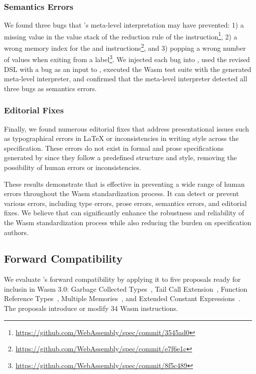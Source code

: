 \subsubsection*{Semantics Errors}
We found three bugs that \dslname's meta-level interpretation may have prevented:
1) a missing value in the value stack of the reduction rule of the 
instruction\footnote{\url{https://github.com/WebAssembly/spec/commit/3545ad0}},
2) a wrong memory index for the 
and 
instructions\footnote{\url{https://github.com/WebAssembly/spec/commit/e7f6e1c}}, and
3) popping a wrong number of values when exiting from
a label\footnote{\url{https://github.com/WebAssembly/spec/commit/8f5c489}}.
We injected each bug into \specdsl, used the revised DSL with a bug as an input to \dslname,
executed the Wasm test suite with the generated meta-level interpreter,
and confirmed that the meta-level interpreter detected all three bugs as semantics errors.

\subsubsection*{Editorial Fixes}
Finally, we found numerous editorial fixes that address presentational issues
such as typographical errors in LaTeX or inconsistencies in writing style across the specification.
These errors do not exist in formal and prose specifications generated by \dslname
since they follow a predefined structure and style,
removing the possibility of human errors or inconsistencies.

\medskip
These results demonstrate that \dslname is effective in preventing a
wide range of human errors throughout the Wasm standardization process.
It can detect or prevent various errors, including type errors, prose errors,
semantics errors, and editorial fixes.
We believe that \dslname can significantly enhance the robustness and
reliability of the Wasm standardization process
while also reducing the burden on specification authors.

\subsection{Forward Compatibility}\label{sec:forward}
We evaluate \dslname's forward compatibility by applying it to
five proposals ready for inclusin in Wasm 3.0:
Garbage Collected Types~\cite{wasm-gc},
Tail Call Extension~\cite{wasm-tce},
Function Reference Types~\cite{wasm-frt},
Multiple Memories~\cite{wasm-mm}, and
Extended Constant Expressions~\cite{wasm-ece}.
The proposals introduce or modify 34 Wasm instructions.

